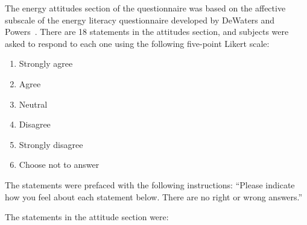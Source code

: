 The energy attitudes section of the questionnaire was based on the affective subscale of the energy literacy questionnaire developed by DeWaters and Powers~\cite{DeWaters2011}. There are 18 statements in the attitudes section, and subjects were asked to respond to each one using the following five-point Likert scale:

\begin{enumerate}
	\item Strongly agree
	\item Agree
	\item Neutral
	\item Disagree
	\item Strongly disagree
	\item Choose not to answer
\end{enumerate}

The statements were prefaced with the following instructions: ``Please indicate how you feel about each statement below. There are no right or wrong answers.''

The statements in the attitude section were:

